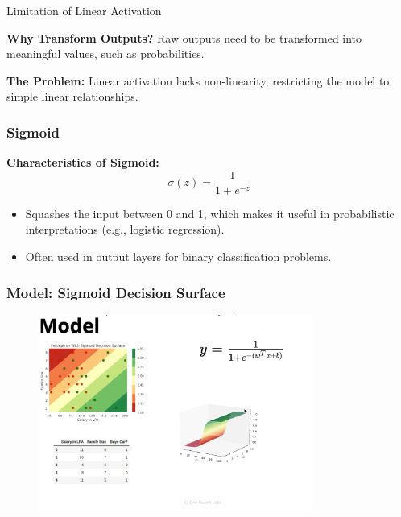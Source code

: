 \documentclass[serif, aspectratio=169]{beamer}
\begin{document}
\begin{frame}{Limitation of Linear Activation}

    \textbf{Why Transform Outputs?} Raw outputs need to be transformed into meaningful values, such as probabilities.

    \textbf{The Problem:} Linear activation lacks non-linearity, restricting the model to simple linear relationships.
\end{frame}


\begin{frame}
    \frametitle{Sigmoid}

    \textbf{Characteristics of Sigmoid:}
    \begin{equation*}
              \sigma(z) = \frac{1}{1 + e^{-z}}
    \end{equation*}
    \begin{itemize}
        \item Squashes the input between 0 and 1, which makes it useful in probabilistic interpretations (e.g., logistic regression).
        \item Often used in output layers for binary classification problems.
    \end{itemize}

    \begin{center}
    \end{center}
\end{frame}

\begin{frame}
    \frametitle{Model: Sigmoid Decision Surface}

        \begin{figure}
        \centering
        \includegraphics[width=0.8\textwidth]{pic/sig.png}  
    \end{figure}
\end{frame}
\end{document}
